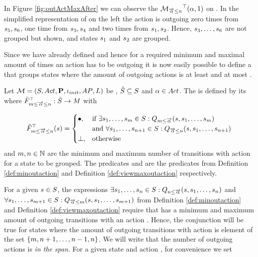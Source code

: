 \documentclass[preview]{standalone}
\begin{document}
\begin{exmp}
	In Figure \ref{fig:outActMaxAfter} we can observe the \viewN $\viewmaxoutaction(\action,1)$ on \chgph. In the simplified representation of \achgphN on the left the action \action is outgoing zero times from $\state_5, \state_6$, one time from $\state_3, \state_4$ and two times from $\state_1, \state_2$. Hence, $\state_3, \dots, \state_6$ are not grouped but shown, and states $\state_1$ and $\state_2$ are grouped.
\end{exmp}

Since we have already defined \grpfctsN and hence \viewsN for a required minimum and maximal amount of times an action has to be outgoing it is now easily possible to define a \viewN that groups states where the amount of outgoing actions is at least \numoutact and at most \numoutactb. 

\begin{definition}
	Let $\chgph = \chgphtuple$ be \achgphN, $\smstates \subseteq \states$ and $\action \in \actions$. The \viewN 
	\viewspanoutaction is defined by its \grpfctN where $\gfctsubspanoutaction : \smstates \to \imggrp$ with

	\[
	\gfctsubspanoutaction(\state) =
	\begin{cases}
			\remelem,				& \text{if } \exists \state_1, \dots, \state_\numoutactb \in \states: \predminoutact[\numoutactb] \\ &\text{and } \forall \state_1, \dots, \state_{\numoutact+1} \in \states: \predmaxoutact \\
			\notppty,     	& \text{otherwise}
		\end{cases}
	\]
	and $\numoutactb, \numoutact \in \natnums$ are the minimum and maximum number of transitions with action \action for a state to be grouped. The predicates \predminoutact and \predmaxoutact are the predicates from Definition \ref{def:minoutaction} and Definition \ref{def:viewmaxoutaction} respectively.
\end{definition}

For a given $\state \in \states$, the expressions $\exists \state_1, \dots, \state_\numoutact \in \states: \predminoutact$ and $\forall \state_1, \dots, \state_{\numoutactb+1} \in \states: \predmaxoutact[\numoutactb]$ from Definition \ref{def:minoutaction} and Definition \ref{def:viewmaxoutaction} require that \state has a minimum and maximum amount of outgoing transitions with an action \action. Hence, the conjunction will be true for states where the amount of outgoing transitions with action \action is element of the set $\{\numoutactb, \numoutact+1, \dots, \numoutact-1, \numoutact\}$. We will write that the number of outgoing actions is \emph{in the span}. For a given state \state and action \action, for convenience we set
\end{document}
